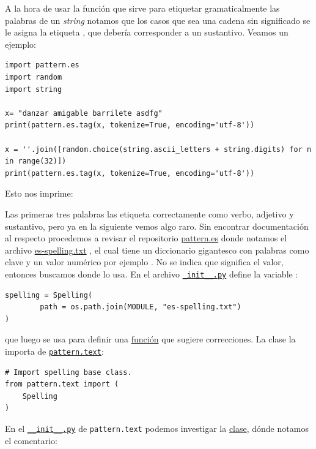 A la hora de usar la función  que sirve para etiquetar gramaticalmente las palabras de un \emph{string} notamos que los casos que sea una cadena sin significado se le asigna la etiqueta , que debería corresponder a un sustantivo. Veamos un ejemplo:
\begin{verbatim}
import pattern.es
import random
import string

x= "danzar amigable barrilete asdfg"
print(pattern.es.tag(x, tokenize=True, encoding='utf-8'))

x = ''.join([random.choice(string.ascii_letters + string.digits) for n in range(32)])
print(pattern.es.tag(x, tokenize=True, encoding='utf-8'))
\end{verbatim}
Esto nos imprime:
\begin{cverbatim}
\end{cverbatim}
Las primeras tres palabras las etiqueta correctamente como verbo, adjetivo y sustantivo, pero ya en la siguiente vemos algo raro. Sin encontrar documentación al respecto procedemos a revisar el repositorio
\href{https://github.com/clips/pattern/tree/master/pattern/text/es}{pattern.es} 
donde notamos el archivo
\href{https://github.com/clips/pattern/blob/master/pattern/text/es/es-spelling.txt}{es-spelling.txt}
, el cual tiene un diccionario gigantesco con palabras como clave y un valor numérico
por ejemplo . No se indica que significa el valor, entonces buscamos donde lo usa. En el archivo
\href{https://github.com/clips/pattern/blob/master/pattern/text/es/__init__.py}{\texttt{\_init\_\_.py}}
define la variable \href{https://github.com/clips/pattern/blob/5b85d998c30ddc6772b56310713530224466083a/pattern/text/es/__init__.py\#L222}{}:

\begin{verbatim}
spelling = Spelling(
        path = os.path.join(MODULE, "es-spelling.txt")
)
\end{verbatim}

que luego se usa para definir una 
\href{https://github.com/clips/pattern/blob/5b85d998c30ddc6772b56310713530224466083a/pattern/text/es/__init__.py\#L271}{función}
que sugiere correcciones. La clase
\href{https://github.com/clips/pattern/blob/5b85d998c30ddc6772b56310713530224466083a/pattern/text/es/__init__.py\#L44}{}
la importa de \href{https://github.com/clips/pattern/tree/master/pattern/text}{\texttt{pattern.text}}:
\begin{verbatim}
# Import spelling base class.
from pattern.text import (
    Spelling
)
\end{verbatim}
En el
\href{https://github.com/clips/pattern/blob/master/pattern/text/__init__.py}{\texttt{\_\_init\_\_.py}} de \texttt{pattern.text} podemos investigar la
\href{https://github.com/clips/pattern/blob/5b85d998c30ddc6772b56310713530224466083a/pattern/text/__init__.py\#L2601}{clase}, dónde notamos el comentario:

